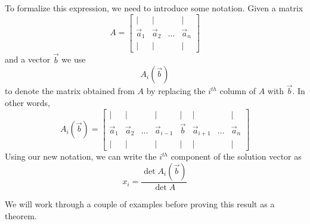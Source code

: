 \documentclass{ximera}
\begin{document}
To formalize this expression, we need to introduce some notation.  Given a matrix
$$A=\begin{bmatrix}
           | & |& &|\\
        \vec{a}_1 & \vec{a}_2&\dots &\vec{a}_n\\
        | & |& &|
         \end{bmatrix}$$
and a vector $\vec{b}$ we use
$$A_i(\vec{b})$$
to denote the matrix obtained from $A$ by replacing the $i^{th}$ column of $A$ with $\vec{b}$. In other words,
\begin{equation}\label{eq:AiNotation}
A_i(\vec{b})=\begin{bmatrix}
           | & |& &|&|&|&&|\\
        \vec{a}_1 & \vec{a}_2&\dots &\vec{a}_{i-1}&\vec{b}&\vec{a}_{i+1}&\dots&\vec{a}_n\\
        | & |& &|&|&|&&|
         \end{bmatrix}
\end{equation}
Using our new notation, we can write the $i^{th}$ component of the solution vector as
$$x_i=\frac{\det{A_i(\vec{b})}}{\det{A}}$$
 
We will work through a couple of examples before proving this result as a theorem.
 
\end{document}
